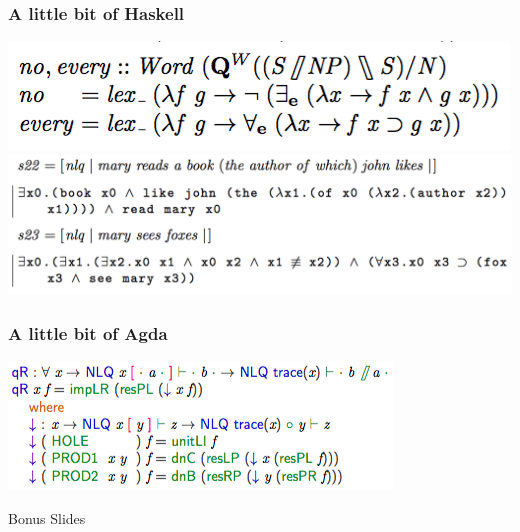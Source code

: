 \documentclass{beamer}
\begin{document}
\begin{frame}
  \frametitle{A little bit of Haskell}
  \includegraphics[width=\textwidth]{images/defs}
  \vfill
  \hspace*{-1em}%
  \includegraphics[width=\textwidth+2em]{images/ex2}
\end{frame}

\begin{frame}
  \frametitle{A little bit of Agda}
  \includegraphics[width=\textwidth]{images/proof}
\end{frame}


\appendix
\begin{frame}
  \Huge
  \centering
  Bonus Slides
\end{frame}
\end{document}
